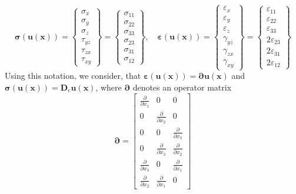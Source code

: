\documentclass{article}
\begin{document}
\begin{equation}\label{31}
\bm{\sigma}(\mathbf{u}(\mathbf{x}))=\left\{\begin{array}{l}{\sigma_{x}} \\ {\sigma_{y}} \\ {\sigma_{z}} \\ {\tau_{y z}} \\ {\tau_{z x}} \\ {\tau_{x y}}\end{array}\right\}=\left\{\begin{array}{c}{\sigma_{11}} \\ {\sigma_{22}} \\ {\sigma_{33}} \\ {\sigma_{23}} \\ {\sigma_{31}} \\ {\sigma_{12}}\end{array}\right\},
\quad 
\bm{\varepsilon}(\mathbf{u}(\mathbf{x}))=\left\{\begin{array}{c}{\varepsilon_{x}} \\ {\varepsilon_{y}} \\ {\varepsilon_{z}} \\ {\gamma_{y z}} \\ {\gamma_{z x}} \\ {\gamma_{x y}}\end{array}\right\}=\left\{\begin{array}{c}{\varepsilon_{11}} \\ {\varepsilon_{22}} \\ {\varepsilon_{33}} \\ {2 \varepsilon_{23}} \\ {2 \varepsilon_{31}} \\ {2 \varepsilon_{12}}\end{array}\right\}
\end{equation}
Using this notation, we consider, that $\bm{\varepsilon}(\mathbf{u}(\mathbf{x}))=\bm{\partial} \mathbf{u}(\mathbf{x})$ and  $ \bm{\sigma}(\mathbf{u}(\mathbf{x}))=\mathbf{D}_{e} \mathbf{u}(\mathbf{x}) $, where $ \bm{\partial} $ denotes an operator matrix  
\begin{equation}\label{32}
\bm{\partial}=\left[\begin{array}{ccc}{\frac{\partial}{\partial x_{1}}} & {0} & {0} \\ {0} & {\frac{\partial}{\partial x_{2}}} & {0} \\ {0} & {0} & {\frac{\partial}{\partial x_{3}}} \\ {0} & {\frac{\partial}{\partial x_{3}}} & {\frac{\partial}{\partial x_{2}}} \\ {\frac{\partial}{\partial x_{3}}} & {0} & {\frac{\partial}{\partial x_{1}}} \\ {\frac{\partial}{\partial x_{2}}} & {\frac{\partial}{\partial x_{1}}} & {0}\end{array}\right]
\end{equation}
\end{document}

